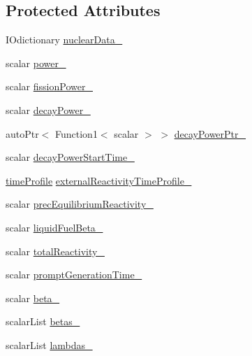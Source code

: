 \subsection*{Protected Attributes}
\begin{DoxyCompactItemize}
\item 
I\+Odictionary \hyperlink{classFoam_1_1pointKineticNeutronics_a5f8311a3a430c76dd8ad948460751646}{nuclear\+Data\+\_\+}
\item 
scalar \hyperlink{classFoam_1_1pointKineticNeutronics_a2bbb0cbee29fe80ead71de9763d34f5c}{power\+\_\+}
\item 
scalar \hyperlink{classFoam_1_1pointKineticNeutronics_a64c7815bb68a92b86bab6efcb930744b}{fission\+Power\+\_\+}
\item 
scalar \hyperlink{classFoam_1_1pointKineticNeutronics_acd0f91371e8bfb50c1910b43a7de88dd}{decay\+Power\+\_\+}
\item 
auto\+Ptr$<$ Function1$<$ scalar $>$ $>$ \hyperlink{classFoam_1_1pointKineticNeutronics_a56fe1da619253dffa8804ba1727a0da1}{decay\+Power\+Ptr\+\_\+}
\item 
scalar \hyperlink{classFoam_1_1pointKineticNeutronics_a2758f1e723a7655f613f90de78286992}{decay\+Power\+Start\+Time\+\_\+}
\item 
\hyperlink{classFoam_1_1timeProfile}{time\+Profile} \hyperlink{classFoam_1_1pointKineticNeutronics_a1a6be493a1ebefcad92a0dbce9d06acd}{external\+Reactivity\+Time\+Profile\+\_\+}
\item 
scalar \hyperlink{classFoam_1_1pointKineticNeutronics_ab3a94d8db63d19dd36a7a5bc2b058795}{prec\+Equilibrium\+Reactivity\+\_\+}
\item 
scalar \hyperlink{classFoam_1_1pointKineticNeutronics_a3d048041776107726d97e16a94c510e9}{liquid\+Fuel\+Beta\+\_\+}
\item 
scalar \hyperlink{classFoam_1_1pointKineticNeutronics_a6f286d3d9961f27137f65a25060091ed}{total\+Reactivity\+\_\+}
\item 
scalar \hyperlink{classFoam_1_1pointKineticNeutronics_a1ba04be9ec1dfb8eaf1597207ee66c44}{prompt\+Generation\+Time\+\_\+}
\item 
scalar \hyperlink{classFoam_1_1pointKineticNeutronics_a6ed8178f88f7848197e7653718fd3621}{beta\+\_\+}
\item 
scalar\+List \hyperlink{classFoam_1_1pointKineticNeutronics_a5ddc297ba6e7169a1889078dbe46b7ec}{betas\+\_\+}
\item 
scalar\+List \hyperlink{classFoam_1_1pointKineticNeutronics_a02ae536279212a8662eb7fd1f9fb465f}{lambdas\+\_\+}

\end{DoxyCompactItemize}
